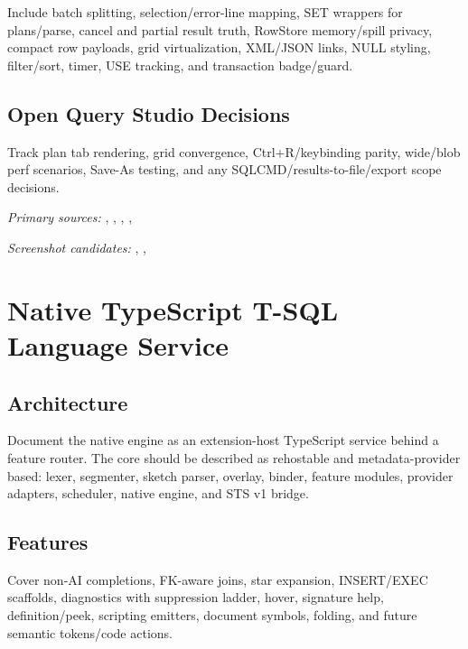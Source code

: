 \documentclass[11pt]{article}
\begin{document}
Include batch splitting, selection/error-line mapping, SET wrappers for plans/parse, cancel and partial result truth, RowStore memory/spill privacy, compact row payloads, grid virtualization, XML/JSON links, NULL styling, filter/sort, timer, USE tracking, and transaction badge/guard.

\subsection{Open Query Studio Decisions}

Track plan tab rendering, grid convergence, Ctrl+R/keybinding parity, wide/blob perf scenarios, Save-As testing, and any SQLCMD/results-to-file/export scope decisions.

\noindent\textit{Primary sources:} , , , , 

\noindent\textit{Screenshot candidates:} , , 

\section{Native TypeScript T-SQL Language Service}

\subsection{Architecture}

Document the native engine as an extension-host TypeScript service behind a feature router.  The core should be described as rehostable and metadata-provider based: lexer, segmenter, sketch parser, overlay, binder, feature modules, provider adapters, scheduler, native engine, and STS v1 bridge.

\subsection{Features}

Cover non-AI completions, FK-aware joins, star expansion, INSERT/EXEC scaffolds, diagnostics with suppression ladder, hover, signature help, definition/peek, scripting emitters, document symbols, folding, and future semantic tokens/code actions.
\end{document}

